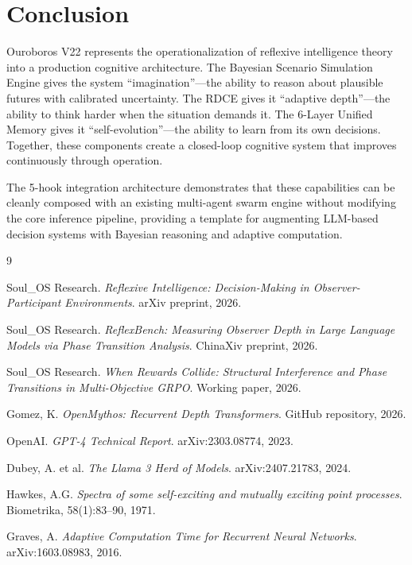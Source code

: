 \documentclass[11pt, a4paper]{article}
\begin{document}
\section{Conclusion}
\label{sec:conclusion}

Ouroboros V22 represents the operationalization of reflexive intelligence theory into a production cognitive architecture. The Bayesian Scenario Simulation Engine gives the system ``imagination''—the ability to reason about plausible futures with calibrated uncertainty. The RDCE gives it ``adaptive depth''—the ability to think harder when the situation demands it. The 6-Layer Unified Memory gives it ``self-evolution''—the ability to learn from its own decisions. Together, these components create a closed-loop cognitive system that improves continuously through operation.

The 5-hook integration architecture demonstrates that these capabilities can be cleanly composed with an existing multi-agent swarm engine without modifying the core inference pipeline, providing a template for augmenting LLM-based decision systems with Bayesian reasoning and adaptive computation.


\begin{thebibliography}{9}

Soul\_OS Research.
\textit{Reflexive Intelligence: Decision-Making in Observer-Participant Environments}.
arXiv preprint, 2026.

Soul\_OS Research.
\textit{ReflexBench: Measuring Observer Depth in Large Language Models via Phase Transition Analysis}.
ChinaXiv preprint, 2026.

Soul\_OS Research.
\textit{When Rewards Collide: Structural Interference and Phase Transitions in Multi-Objective GRPO}.
Working paper, 2026.

Gomez, K.
\textit{OpenMythos: Recurrent Depth Transformers}.
GitHub repository, 2026.

OpenAI.
\textit{GPT-4 Technical Report}.
arXiv:2303.08774, 2023.

Dubey, A. et al.
\textit{The Llama 3 Herd of Models}.
arXiv:2407.21783, 2024.

Hawkes, A.G.
\textit{Spectra of some self-exciting and mutually exciting point processes}.
Biometrika, 58(1):83--90, 1971.

Graves, A.
\textit{Adaptive Computation Time for Recurrent Neural Networks}.
arXiv:1603.08983, 2016.

\end{thebibliography}
\end{document}
